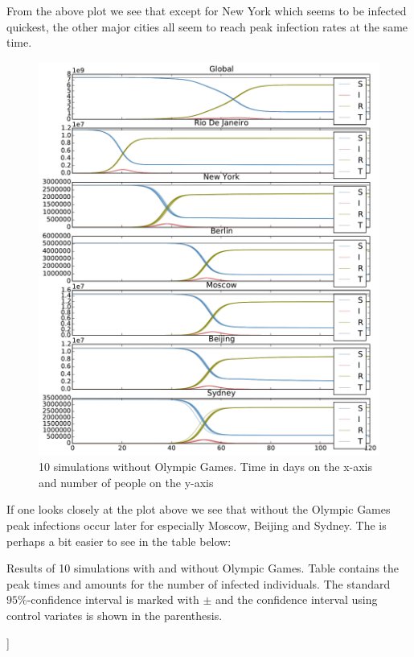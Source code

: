 From the above plot we see that except for New York which seems to be infected quickest, the other major cities all seem to reach peak infection rates at the same time. 

\begin{figure}[H]
	\centering
	\includegraphics[width=1.0 \linewidth]{plots/no_rio.pdf}
	\caption{10 simulations without Olympic Games. Time in days on the x-axis and number of people on the y-axis}
\end{figure}

If one looks closely at the plot above we see that without the Olympic Games peak infections occur later for especially Moscow, Beijing and Sydney. The is perhaps a bit easier to see in the table below:

\begin{table}[H]
	\centering
	
	\caption{Results of 10 simulations with and without Olympic Games. Table contains the peak times and amounts for the number of infected individuals. The standard $95\%$-confidence interval is marked with $\pm$ and the confidence interval using control variates is shown in the parenthesis.}
\end{table}]

